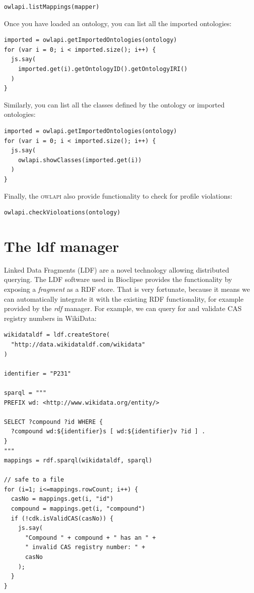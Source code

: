 \documentclass[a5paper, 10pt]{memoir}
\begin{document}
\begin{refsection}
\begin{Verbatim}
owlapi.listMappings(mapper)
\end{Verbatim}
Once you have loaded an ontology, you can list all the imported
ontologies:

\begin{Verbatim}
imported = owlapi.getImportedOntologies(ontology)
for (var i = 0; i < imported.size(); i++) {
  js.say(
    imported.get(i).getOntologyID().getOntologyIRI()
  )
}
\end{Verbatim}
Similarly, you can list all the classes defined by the ontology or imported
ontologies:

\begin{Verbatim}
imported = owlapi.getImportedOntologies(ontology)
for (var i = 0; i < imported.size(); i++) {
  js.say(
    owlapi.showClasses(imported.get(i))
  )
}
\end{Verbatim}
Finally, the \textsc{owlapi} also provide functionality to check for profile
violations:

\begin{Verbatim}
owlapi.checkVioloations(ontology)
\end{Verbatim}

\section{The ldf manager}

Linked Data Fragments (LDF) are a novel technology allowing
distributed querying. The LDF software used in Bioclipse provides the functionality
by exposing a \emph{fragment} as a RDF store. That is very fortunate, because it
means we can automatically integrate it with the existing RDF functionality, for example
provided by the \emph{rdf} manager. For example, we can query for and validate CAS
registry numbers in WikiData:

\begin{Verbatim}
wikidataldf = ldf.createStore(
  "http://data.wikidataldf.com/wikidata"
)

identifier = "P231"

sparql = """
PREFIX wd: <http://www.wikidata.org/entity/>

SELECT ?compound ?id WHERE {
  ?compound wd:${identifier}s [ wd:${identifier}v ?id ] .
}
"""
mappings = rdf.sparql(wikidataldf, sparql)

// safe to a file
for (i=1; i<=mappings.rowCount; i++) {
  casNo = mappings.get(i, "id")
  compound = mappings.get(i, "compound")
  if (!cdk.isValidCAS(casNo)) {
    js.say(
      "Compound " + compound + " has an " +
      " invalid CAS registry number: " +
      casNo
    );
  }
}
\end{Verbatim}



\printbibliography[heading=subbibliography]
\end{refsection}
\end{document}
